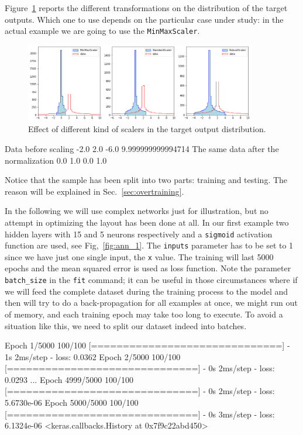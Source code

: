 Figure~\ref{fig:scalers} reports the different transformations on the distribution of the target outputs. Which one to use depends on the particular case under study: in the actual example we are going to use the \texttt{MinMaxScaler}.

\begin{figure}[htb]
\centering
\includegraphics[width=0.9\textwidth]{figures/scalers}
\caption{Effect of different kind of scalers in the target output distribution.}
\label{fig:scalers}
\end{figure}

\begin{ioutput}
Data before scaling -2.0 2.0 -6.0 9.999999999994714
The same data after the normalization  0.0 1.0 0.0 1.0
\end{ioutput}

Notice that the sample has been split into two parts: training and testing. The reason will be explained in Sec.~\ref{sec:overtraining}.


In the following we will use complex networks just for illustration, but no attempt in optimizing the layout has been done at all.
In our first example two hidden layers with 15 and 5 neurons respectively and a \texttt{sigmoid} activation function are used, see Fig,~\ref{fig:ann_1}. The \texttt{inputs} parameter has to be set to 1 since we have just one single input, the \texttt{x} value.
The training will last 5000 epochs and the mean squared error is used as loss function. Note the parameter \texttt{batch\_size} in the \texttt{fit} command; it can be useful in those circumstances where if we will feed the complete dataset during the training process to the model and then will try to do a back-propagation for all examples at once, we might run out of memory, and each training epoch may take too long to execute. To avoid a situation like this, we need to split our dataset indeed into batches.


\begin{ioutput}
Epoch 1/5000
100/100 [==============================] - 1s 2ms/step - loss: 0.0362
Epoch 2/5000
100/100 [==============================] - 0s 2ms/step - loss: 0.0293
...
Epoch 4999/5000
100/100 [==============================] - 0s 2ms/step - loss: 5.6730e-06
Epoch 5000/5000
100/100 [==============================] - 0s 3ms/step - loss: 6.1324e-06
<keras.callbacks.History at 0x7f9c22abd450>
\end{ioutput}

